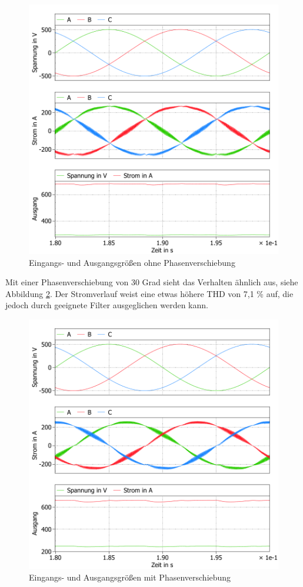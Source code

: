 			\begin{figure}[H]
				\centering
				\includegraphics[width=1\linewidth]{content/Grafiken/B6_AC+DC_0Grad}
				\caption{Eingangs- und Ausgangsgrößen ohne Phasenverschiebung}
				\label{fig:b6acdc0grad}
			\end{figure}
			\pagebreak
			Mit einer Phasenverschiebung von 30 Grad sieht das Verhalten ähnlich aus, siehe Abbildung \ref{fig:b6acdc30grad}.  Der Stromverlauf weist eine etwas höhere THD von 7,1 \% auf, die jedoch durch geeignete Filter ausgeglichen werden kann.
			\begin{figure}
				\centering
				\includegraphics[width=1\linewidth]{content/Grafiken/B6_AC+DC_30Grad}
				\caption{Eingangs- und Ausgangsgrößen mit Phasenverschiebung}
				\label{fig:b6acdc30grad}
			\end{figure}
